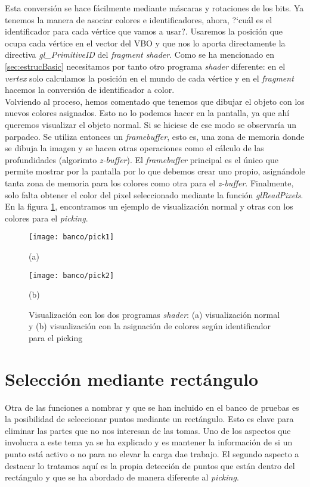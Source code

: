 Esta conversión se hace fácilmente mediante máscaras y rotaciones de los bits. Ya tenemos la manera de asociar colores e identificadores, ahora, ?`cuál es el identificador para cada vértice que vamos a usar?. Usaremos la posición que ocupa cada vértice en el vector del VBO y que nos lo aporta directamente la directiva \textit{gl\_PrimitiveID} del \textit{fragment shader}. Como se ha mencionado en \ref{sec:estrucBasic} necesitamos por tanto otro programa \textit{shader} diferente: en el \textit{vertex} solo calculamos la posición en el mundo de cada vértice y en el \textit{fragment} hacemos la conversión de identificador a color. \\

Volviendo al proceso, hemos comentado que tenemos que dibujar el objeto con los nuevos colores asignados. Esto no lo podemos hacer en la pantalla, ya que ahí queremos visualizar el objeto normal. Si se hiciese de ese modo se observaría un parpadeo. Se utiliza entonces un \textit{framebuffer}, esto es, una zona de memoria donde se dibuja la imagen y se hacen otras operaciones como el cálculo de las profundidades (algorimto \textit{z-buffer}). El \textit{framebuffer} principal es el único que permite mostrar por la pantalla por lo que debemos crear uno propio, asignándole tanta zona de memoria para los colores como otra para el \textit{z-buffer}. Finalmente, solo falta obtener el color del pixel seleccionado mediante la función \textit{glReadPixels}. En la figura \ref{fig:shaders}, encontramos un ejemplo de visualización normal y otras con los colores para el \textit{picking}.

\begin{figure}[h!]
	\begin{minipage}{0.5\textwidth}
		\centering
		\texttt{[image: banco/pick1]} 
		\caption*{(a)}
	\end{minipage}
	\begin{minipage}{0.5\textwidth}
		\centering
		\texttt{[image: banco/pick2]} 
			\caption*{(b)}
	\end{minipage}
	\caption{Visualización con los dos programas \textit{shader}: (a) visualización normal y (b) visualización con la asignación de colores según identificador para el picking}
	\label{fig:shaders}
\end{figure}

\section{Selección mediante rectángulo}\label{sec:selecRec}
Otra de las funciones a nombrar y que se han incluido en el banco de pruebas es la posibilidad de seleccionar puntos mediante un rectángulo. Esto es clave para eliminar las partes que no nos interesan de las tomas. Uno de los aspectos que involucra a este tema ya se ha explicado y es mantener la información de si un punto está activo o no para no elevar la carga dae trabajo. El segundo aspecto a destacar lo tratamos aquí es la propia detección de puntos que están dentro del rectángulo y que se ha abordado de manera diferente al \textit{picking}.\\


